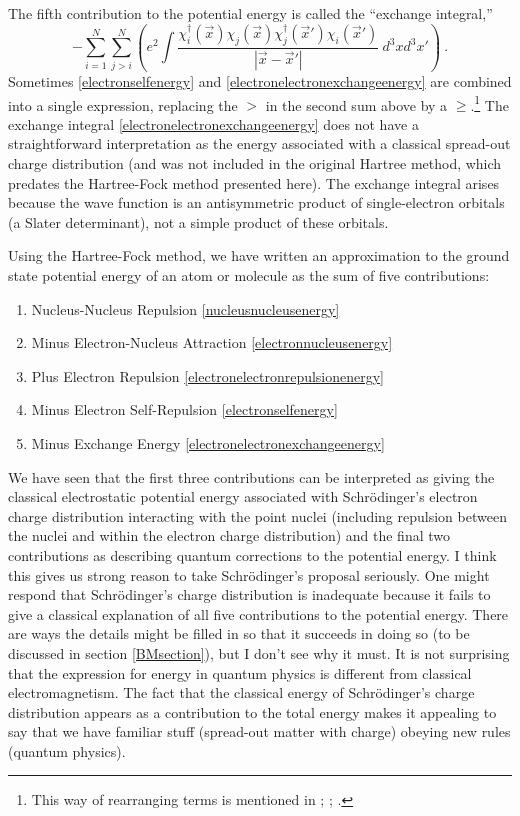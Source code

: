\documentclass[12pt,onecolumn,secnumarabic,amsmath,amssymb,balancelastpage,nofootinbib]{article}
\begin{document}
The fifth contribution to the potential energy is called the ``exchange integral,''
\begin{equation}
-\sum_{i=1}^{N}\sum_{j>i}^{N}\left(e^2\int{\frac{\chi_i^{\dagger}(\vec{x})\chi_j(\vec{x})\chi_j^{\dagger}(\vec{x}')\chi_i(\vec{x}')}{|\vec{x}-\vec{x}'|}\  d^3 x d^3 x'}\right)
\ .
\label{electronelectronexchangeenergy}
\end{equation}
Sometimes \eqref{electronselfenergy} and \eqref{electronelectronexchangeenergy} are combined into a single expression, replacing the $>$ in the second sum above by a $\geq$.\footnote{This way of rearranging terms is mentioned in \cite[pg.\ 436]{blinder1965}; \cite[pg.\ 5048]{perdew1981}; \cite[pg.\ 7]{parryang}.}  The exchange integral \eqref{electronelectronexchangeenergy} does not have a straightforward interpretation as the energy associated with a classical spread-out charge distribution (and was not included in the original Hartree method, which predates the Hartree-Fock method presented here).  The exchange integral arises because the wave function is an antisymmetric product of single-electron orbitals (a Slater determinant), not a simple product of these orbitals.

Using the Hartree-Fock method, we have written an approximation to the ground state potential energy of an atom or molecule as the sum of five contributions:
\begin{enumerate}
\setlength\itemsep{0 pt}
\item Nucleus-Nucleus Repulsion \eqref{nucleusnucleusenergy}
\item Minus Electron-Nucleus Attraction \eqref{electronnucleusenergy}
\item Plus Electron Repulsion \eqref{electronelectronrepulsionenergy}
\item Minus Electron Self-Repulsion \eqref{electronselfenergy}
\item Minus Exchange Energy \eqref{electronelectronexchangeenergy}
\end{enumerate}
We have seen that the first three contributions can be interpreted as giving the classical electrostatic potential energy associated with Schr\"{o}dinger's electron charge distribution interacting with the point nuclei (including repulsion between the nuclei and within the electron charge distribution) and the final two contributions as describing quantum corrections to the potential energy.  I think this gives us strong reason to take Schr\"{o}dinger's proposal seriously.  One might respond that Schr\"{o}dinger's charge distribution is inadequate because it fails to give a classical explanation of all five contributions to the potential energy.  There are ways the details might be filled in so that it succeeds in doing so (to be discussed in section \ref{BMsection}), but I don't see why it must.  It is not surprising that the expression for energy in quantum physics is different from classical electromagnetism.  The fact that the classical energy of Schr\"{o}dinger's charge distribution appears as a contribution to the total energy makes it appealing to say that we have familiar stuff (spread-out matter with charge) obeying new rules (quantum physics).
\end{document}
